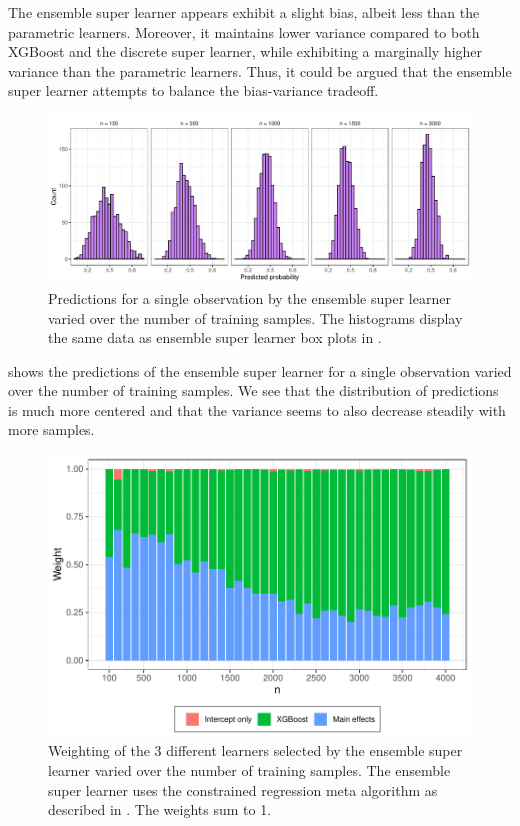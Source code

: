 \documentclass[./main.tex]{subfiles}
\begin{document}
The ensemble super learner appears exhibit a slight bias, albeit less than the parametric learners. Moreover, it maintains lower variance compared to both XGBoost and the discrete super learner, while exhibiting a marginally higher variance than the parametric learners. Thus, it could be argued that the ensemble super learner attempts to balance the bias-variance tradeoff.
\begin{figure}[H]
    \centering
    \includegraphics[width=\textwidth]{figures/hist_esl_dist.pdf}
    \caption{Predictions for a single observation by the ensemble super learner varied over the number of training samples. The histograms display the same data as ensemble super learner box plots in .}
    \label{fig:hist_esl_dist}
\end{figure}
 shows the predictions of the ensemble super learner for a single observation varied over the number of training samples. We see that the distribution of predictions is much more centered and that the variance seems to also decrease steadily with more samples. 
\begin{figure}[H]
    \centering
    \includegraphics[width=\textwidth]{figures/esl_weights.pdf}
    \caption{Weighting of the 3 different learners selected by the ensemble super learner varied over the number of training samples. The ensemble super learner uses the constrained regression meta algorithm as described in . The weights sum to 1.}
    \label{fig:esl_weights}
\end{figure}
\end{document}
